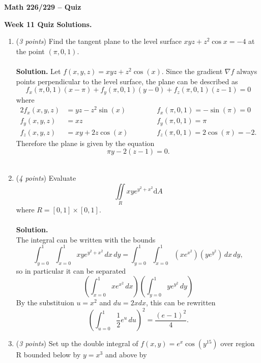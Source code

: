 \documentclass[12 pt]{article}
\begin{document}
	\begin{center}
		\textbf{\hfill Math 226/229 -- Quiz} \\
	\end{center}
	\medskip

	\noindent
	\textbf{Week 11 Quiz Solutions.} \hfill
	\vspace{.1in}
	\hspace*{0.2in}
	\medskip
	\noindent
  \begin{enumerate}
		\item (\textit{3 points}) Find the tangent plane to the level surface
		$xyz+z^2\cos{x}=-4$ at the point $(\pi,0,1)$.
    \\~\\
    \textbf{Solution.}
		Let $f(x,y,z) = xyz + z^2\cos(x)$. Since the gradient $\nabla f$ always
		points perpendicular to the level surface, the plane can be described as \[
			f_x(\pi,0,1)(x - \pi) + f_y(\pi,0,1)(y - 0) + f_z(\pi,0,1)(z - 1) = 0
		\] where \begin{alignat*}{2}
			f_x(x,y,z) &= yz - z^2\sin(x)
			&&\hspace{1cm} f_x(\pi,0,1) = -\sin(\pi) = 0\\
			f_y(x,y,z) &= xz
			&&\hspace{1cm} f_y(\pi,0,1) = \pi \\
			f_z(x,y,z) &= xy + 2z\cos(x)
			&&\hspace{1cm} f_z(\pi,0,1) = 2\cos(\pi) = -2.
		\end{alignat*}
		Therefore the plane is given by the equation \[
			\pi y -2(z-1) = 0.
		\]
    \\
		\item (\textit{4 points}) Evaluate \[
      \iint\limits_{R} xye^{y^2+x^2}\mathrm{d}A
    \] where $R=[0, 1] \times [0, 1]$.
    \\~\\
    \textbf{Solution.}
    \\
		The integral can be written with the bounds \[
			\int_{y=0}^1\int_{x=0}^1 xye^{y^2 + x^2}\,dx\,dy =
			\int_{y=0}^1\int_{x=0}^1 (xe^{x^2})(ye^{y^2})\,dx\,dy,
		\] so in particular it can be separated \[
			\left(\int_{x=0}^1 xe^{x^2}\,dx\right)
			\left(\int_{y=0}^1 ye^{y^2}\,dy\right)
		\]
		By the substituion $u = x^2$ and $du = 2x dx$, this can be rewritten \[
			\left(\int_{u=0}^1 \frac12 e^u\,du\right)^2
			= \frac{(e - 1)^2}{4}.
		\]
		\pagebreak
		\item (\textit{3 points}) Set up the double integral of
    $f(x,y)=e^x\cos(y^{15})$ over region R bounded below by $y=x^3$ and above by

\end{enumerate}
\end{document}
